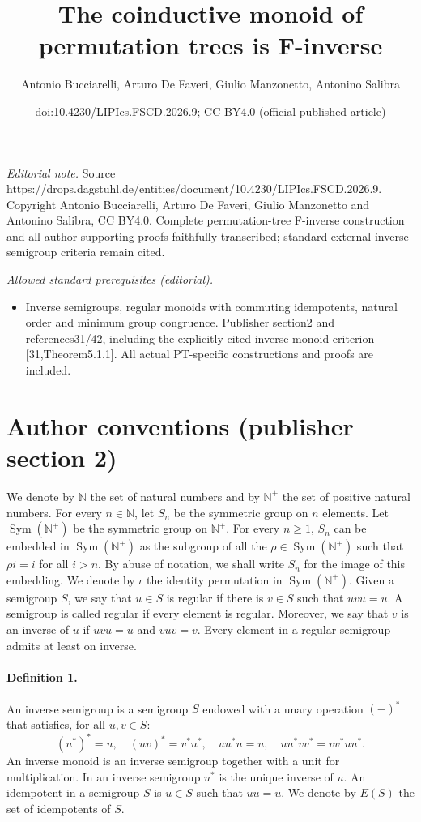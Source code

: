 \documentclass[10pt,a4paper]{amsart}
\title{The coinductive monoid of permutation trees is F-inverse}
\author{Antonio Bucciarelli, Arturo De Faveri, Giulio Manzonetto, Antonino Salibra}
\date{doi:10.4230/LIPIcs.FSCD.2026.9; CC BY4.0 (official published article)}
\begin{document}
\maketitle
\noindent\textit{Editorial note.} Source https://drops.dagstuhl.de/entities/document/10.4230/LIPIcs.FSCD.2026.9. Copyright Antonio Bucciarelli, Arturo De Faveri, Giulio Manzonetto and Antonino Salibra, CC BY4.0. Complete permutation-tree F-inverse construction and all author supporting proofs faithfully transcribed; standard external inverse-semigroup criteria remain cited.\par\medskip
\noindent\textit{Allowed standard prerequisites (editorial).}\begin{itemize}
\item Inverse semigroups, regular monoids with commuting idempotents, natural order and minimum group congruence. Publisher section2 and references31/42, including the explicitly cited inverse-monoid criterion [31,Theorem5.1.1]. All actual PT-specific constructions and proofs are included.
\end{itemize}\medskip
\section*{Author conventions (publisher section 2)}
We denote by $\mathbb N$ the set of natural numbers and by $\mathbb N^+$ the set of positive natural numbers.
For every $n\in\mathbb N$, let $S_n$ be the symmetric group on $n$ elements. Let $\operatorname{Sym}(\mathbb N^+)$ be the symmetric group on $\mathbb N^+$.
For every $n\ge1$, $S_n$ can be embedded in $\operatorname{Sym}(\mathbb N^+)$ as the subgroup of all the $\rho\in\operatorname{Sym}(\mathbb N^+)$ such that $\rho i=i$ for all $i>n$. By abuse of notation, we shall write $S_n$ for the image of this embedding. We denote by $\iota$ the identity permutation in $\operatorname{Sym}(\mathbb N^+)$.
Given a semigroup $S$, we say that $u\in S$ is regular if there is $v\in S$ such that $uvu=u$. A semigroup is called regular if every element is regular.
Moreover, we say that $v$ is an inverse of $u$ if $uvu=u$ and $vuv=v$. Every element in a regular semigroup admits at least on inverse.
\paragraph{Definition 1.} An inverse semigroup is a semigroup $S$ endowed with a unary operation $(-)^*$ that satisfies, for all $u,v\in S$:
\[
(u^*)^*=u,\quad(uv)^*=v^*u^*,\quad uu^*u=u,\quad uu^*vv^*=vv^*uu^*.
\]
An inverse monoid is an inverse semigroup together with a unit for multiplication.
In an inverse semigroup $u^*$ is the unique inverse of $u$.
An idempotent in a semigroup $S$ is $u\in S$ such that $uu=u$. We denote by $E(S)$ the set of idempotents of $S$.
\end{document}

